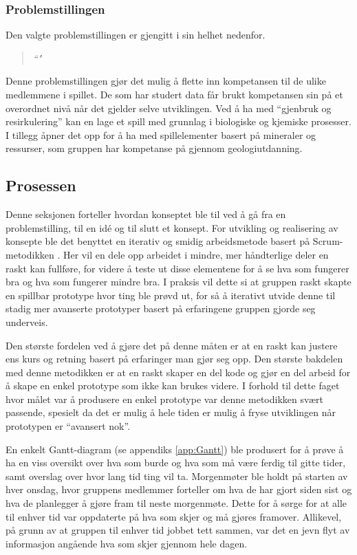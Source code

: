 \subsubsection{Problemstillingen}
Den valgte problemstillingen er gjengitt i sin helhet nedenfor.
\begin{quotation}
\large\emph{``"}
\end{quotation}
Denne problemstillingen gjør det mulig å flette inn kompetansen til de
ulike medlemmene i spillet. De som har studert data får brukt
kompetansen sin på et overordnet nivå når det gjelder selve utviklingen.
Ved å ha med ``gjenbruk og resirkulering'' kan en lage et spill med
grunnlag i biologiske og kjemiske prosesser. I tillegg åpner det opp for å
ha med spillelementer basert på mineraler og ressurser, som gruppen har
kompetanse på gjennom geologiutdanning.



\subsection{Prosessen}
Denne seksjonen forteller hvordan konseptet ble til ved å gå fra en problemstilling, til en idé og til slutt et konsept. For utvikling og realisering av konsepte ble det benyttet en iterativ og smidig arbeidsmetode \cite{online:agile_manifesto} basert på Scrum-metodikken \cite{Scrum}. Her vil en dele opp arbeidet i mindre, mer håndterlige deler en raskt kan fullføre, for videre å teste ut disse elementene for å se hva som fungerer bra og hva som fungerer mindre bra. I praksis vil dette si at gruppen raskt skapte en spillbar prototype hvor ting ble prøvd ut, for så å iterativt utvide denne til stadig mer avanserte prototyper basert på erfaringene gruppen gjorde seg underveis.

Den største fordelen ved å gjøre det på denne måten er at en raskt kan justere ens kurs og retning basert på erfaringer man gjør seg opp. 
Den største bakdelen med denne metodikken er at en raskt skaper en del kode og gjør en del arbeid for å skape en enkel prototype som ikke kan brukes videre.
I forhold til dette faget hvor målet var å produsere en enkel prototype var denne metodikken svært passende, spesielt da det er mulig å hele tiden er mulig å fryse utviklingen når prototypen er ``avansert nok''.


En enkelt Gantt-diagram (se appendiks \ref{app:Gantt}) ble produsert for å prøve å ha en viss oversikt over hva som burde og hva som må være ferdig til gitte tider, samt overslag over hvor lang tid ting vil ta.
Morgenmøter ble holdt på starten av hver onsdag, hvor gruppens medlemmer forteller om hva de har gjort siden sist og hva de planlegger å gjøre fram til neste morgenmøte. Dette for å sørge for at alle til enhver tid var oppdaterte på hva som skjer og må gjøres framover.
Allikevel, på grunn av at gruppen til enhver tid jobbet tett sammen, var det en jevn flyt av informasjon angående hva som skjer gjennom hele dagen.



